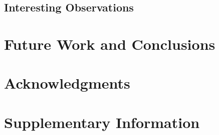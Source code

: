 \documentclass[fleqn,10pt,onecolumn]{ipcc} %
\begin{document}
\subsection{Interesting Observations}

\section{Future Work and Conclusions}

\section*{Acknowledgments} %


\newpage
{}



\newpage
\section*{Supplementary Information} %

\end{document}
